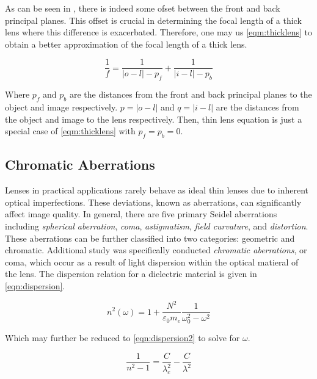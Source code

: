 \documentclass[aip, cp, amsmath, amssymb, reprint, nofootinbib]{revtex4-2}
\begin{document}
        As can be seen in , there is indeed some ofset between the front and back principal planes. This offset is crucial in determining the focal length of a thick lens where this difference is exacerbated. Therefore, one may us \eqref{eqm:thicklens} to obtain a better approximation of the focal length of a thick lens.

        \begin{equation} \label{eqm:thicklens}
            \frac{1}{f} = \frac{1}{|o-l|-p_f} + \frac{1}{|i-l|-p_b}
        \end{equation}
        
        Where $p_f$ and $p_b$ are the distances from the front and back principal planes to the object and image respectively. $p = |o-l|$ and $q = |i-l|$ are the distances from the object and image to the lens respectively. Then,  thin lens equation is just a special case of \eqref{eqm:thicklens} with $p_f = p_b = 0$.

        \subsection{Chromatic Aberrations}
        
        Lenses in practical applications rarely behave as ideal thin lenses due to inherent optical imperfections. These deviations, known as aberrations, can significantly affect image quality. In general, there are five primary Seidel aberrations including \textit{spherical aberration}, \textit{coma}, \textit{astigmatism}, \textit{field curvature}, and \textit{distortion}. These aberrations can be further classified into two categories: geometric and chromatic. Additional study was specifically conducted \textit{chromatic aberrations}, or coma, which occur as a result of light dispersion within the optical matieral of the lens. The dispersion relation for a dielectric material is given in \eqref{eqn:dispersion}.

        \begin{equation} \label{eqn:dispersion}
            n^2(\omega) = 1 + \frac{N^2}{\varepsilon_0 m _e}\frac{1}{\omega_0^2 - \omega^2}
        \end{equation}

        Which may further be reduced \cite{labmanual} to \eqref{eqn:dispersion2} to solve for $\omega$.

        \begin{equation} \label{eqn:dispersion2}
            \frac{1}{n^2 - 1} = \frac{C}{\lambda_c^2} - \frac{C}{\lambda^2} 
        \end{equation}
\end{document}

